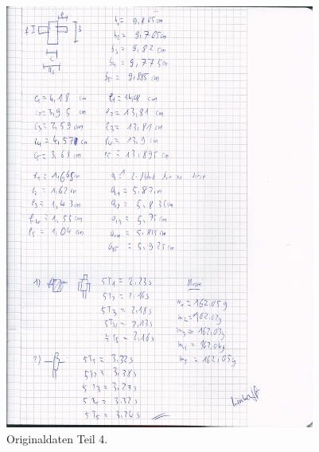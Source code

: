 \begin{figure}[H]
  \centering
  \includegraphics[height=14cm]{original4.jpg}
  \caption{Originaldaten Teil 4.}
  \label{fig:original4}
\end{figure}

\printbibliography


